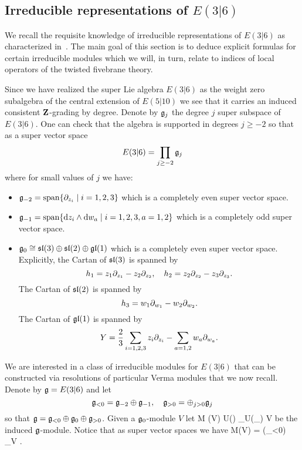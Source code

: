 \documentclass[11pt]{amsart}
\begin{document}
\subsection{Irreducible representations of $E(3|6)$}
We recall the requisite knowledge of irreducible representations of $E(3|6)$ as characterized in~\cite{KR1,KR2,KR3}.
The main goal of this section is to deduce explicit formulas for certain irreducible modules which we will, in turn, relate to indices of local operators of the twisted fivebrane theory. 

Since we have realized the super Lie algebra $E(3|6)$ as the weight zero subalgebra of the central extension of $E(5|10)$ we see that it carries an induced consistent $\mathbf{Z}$-grading by degree. 
Denote by $\mathfrak g_j$ the degree $j$ super subspace of $E(3|6)$.
One can check that the algebra is supported in degrees $j \geq -2$ so that as a super vector space
\[
E(3|6) = \prod_{j \geq -2} \mathfrak g_j
\]
where for small values of $j$ we have:
\begin{itemize}
\item $\mathfrak g_{-2} = {\rm span}\{\partial_{z_i}\; | \; {i=1,2,3}\}$ which is a completely even super vector space. 
\item $\mathfrak g_{-1} = {\rm span}\{{\rm d} z_i \wedge {\rm d} w_a \; | \; i=1,2,3, a=1,2\}$ which is a completely odd super vector space.
\item $\mathfrak g_0 \cong \mathfrak{sl}(3) \oplus \mathfrak{sl}(2) \oplus \mathfrak{gl}(1)$ which is a completely even super vector space.
Explicitly, the Cartan of $\mathfrak{sl}(3)$ is spanned by 
\[
h_1 = z_1 \partial_{z_1} - z_2 \partial_{z_2}, \quad h_2 = z_2 \partial_{z_2} - z_3 \partial_{z_3} .
\]
The Cartan of $\mathfrak{sl}(2)$ is spanned by
\[
h_3 = w_1 \partial_{w_1} - w_2 \partial_{w_2} .
\]
The Cartan of $\mathfrak{gl}(1)$ is spanned by
\[
Y = \frac23 \sum_{i=1,2,3} z_i \partial_{z_i} - \sum_{a=1,2} w_a \partial_{w_a} .
\]
\end{itemize}

\parsec[s:vermas]

We are interested in a class of irreducible modules for $E(3|6)$ that can be constructed via resolutions of particular Verma modules \cite{KR2} that we now recall.
Denote by $\mathfrak g = E(3|6)$ and let 
\[
\mathfrak g_{<0} = \mathfrak g_{-2} \oplus \mathfrak g_{-1} , \quad \mathfrak{g}_{>0} = \oplus_{j>0} \mathfrak g_j 
\]
so that $\mathfrak g = \mathfrak g_{<0} \oplus \mathfrak g_0 \oplus \mathfrak g_{>0}$. 
Given a $\mathfrak g_0$-module $V$ let 
\beqn\label{eqn:verma1}
M (V)  U(\fg) \otimes_{U(\fg_{})} V 
\eeqn
be the induced $\mathfrak g$-module. 
Notice that as super vector spaces we have 
\beqn
M(V) = \Sym(\fg_{<0}) \otimes_\C V .
\eeqn
\end{document}
